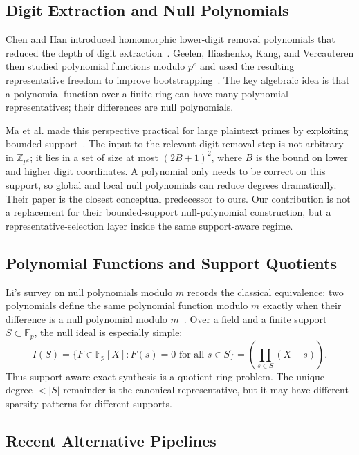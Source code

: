 \documentclass[a4paper,runningheads]{llncs}
\newcommand{\Fp}{\mathbb{F}_p}
\newcommand{\ZZ}{\mathbb{Z}}
\begin{document}
\subsection{Digit Extraction and Null Polynomials}

Chen and Han introduced homomorphic lower-digit removal polynomials that
reduced the depth of digit extraction~\cite{chen_han_lower_digits}.  Geelen,
Iliashenko, Kang, and Vercauteren then studied polynomial functions modulo
$p^e$ and used the resulting representative freedom to improve
bootstrapping~\cite{geelen_polyfunctions}.  The key algebraic idea is that a
polynomial function over a finite ring can have many polynomial
representatives; their differences are null polynomials.

Ma et al. made this perspective practical for large plaintext primes by
exploiting bounded support~\cite{ma_large_p}.  The input to the relevant
digit-removal step is not arbitrary in $\ZZ_{p^e}$; it lies in a set of size
at most $(2B+1)^2$, where $B$ is the bound on lower and higher digit
coordinates.  A polynomial only needs to be correct on this support, so global
and local null polynomials can reduce degrees dramatically.  Their paper is
the closest conceptual predecessor to ours.  Our contribution is not a
replacement for their bounded-support null-polynomial construction, but a
representative-selection layer inside the same support-aware regime.

\subsection{Polynomial Functions and Support Quotients}

Li's survey on null polynomials modulo $m$ records the classical equivalence:
two polynomials define the same polynomial function modulo $m$ exactly when
their difference is a null polynomial modulo $m$~\cite{li_null_polynomials}.
Over a field and a finite support $S\subset\Fp$, the null ideal is especially
simple:
\[
  I(S)=\{F\in\Fp[X]: F(s)=0\text{ for all }s\in S\}
      =\left(\prod_{s\in S}(X-s)\right).
\]
Thus support-aware exact synthesis is a quotient-ring problem.  The unique
degree-$<|S|$ remainder is the canonical representative, but it may have
different sparsity patterns for different supports.

\subsection{Recent Alternative Pipelines}
\end{document}
